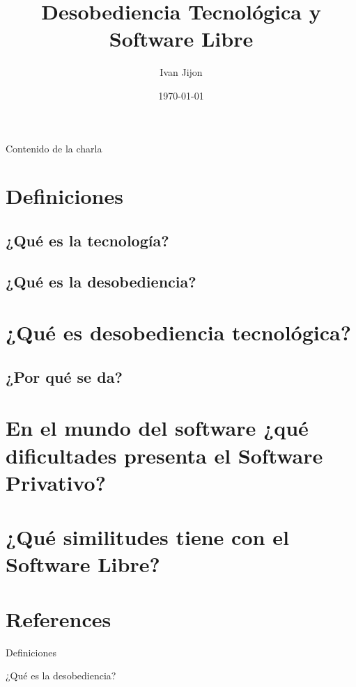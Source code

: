\documentclass[spanish]{beamer}
\title{Desobediencia Tecnológica y Software Libre}
\author{Ivan Jijon}
\institute{FLISoL 2023, Quito - Ecuador}
\date{\today}
\begin{document}
\begin{frame}
    \titlepage
\end{frame}


\begin{frame}{Contenido de la charla}
    \tableofcontents
\end{frame}

\section{Definiciones}
    \subsection{¿Qué es la \bf{tecnología}?}
    \subsection{¿Qué es la \bf{desobediencia}?}
\section{¿Qué es \bf{desobediencia tecnológica}?}
    \subsection{¿Por qué se da?}
\section{En el mundo del software ¿qué dificultades presenta el Software Privativo?}
\section{¿Qué similitudes tiene con el \bf{Software Libre?}}
\section*{References}

\begin{frame}{Definiciones}
\end{frame}

\begin{frame}{¿Qué es la desobediencia?}
\end{frame}
\end{document}
